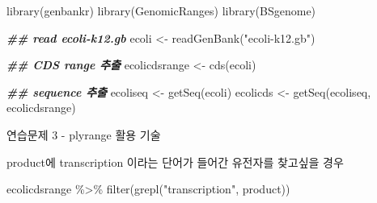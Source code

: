 \documentclass[
]{book}
\newenvironment{Shaded}{\begin{snugshade}}{\end{snugshade}}
\newcommand{\DocumentationTok}[1]{\textcolor[rgb]{0.56,0.35,0.01}{\textbf{\textit{#1}}}}
\newcommand{\FunctionTok}[1]{\textcolor[rgb]{0.00,0.00,0.00}{#1}}
\newcommand{\NormalTok}[1]{#1}
\newcommand{\OtherTok}[1]{\textcolor[rgb]{0.56,0.35,0.01}{#1}}
\newcommand{\SpecialCharTok}[1]{\textcolor[rgb]{0.00,0.00,0.00}{#1}}
\newcommand{\StringTok}[1]{\textcolor[rgb]{0.31,0.60,0.02}{#1}}
\begin{document}
\begin{Shaded}
\begin{Highlighting}[]
\FunctionTok{library}\NormalTok{(genbankr)}
\FunctionTok{library}\NormalTok{(GenomicRanges)}
\FunctionTok{library}\NormalTok{(BSgenome)}


\DocumentationTok{\#\# read ecoli{-}k12.gb}
\NormalTok{ecoli }\OtherTok{\textless{}{-}} \FunctionTok{readGenBank}\NormalTok{(}\StringTok{"ecoli{-}k12.gb"}\NormalTok{)}

\DocumentationTok{\#\# CDS range 추출}
\NormalTok{ecolicdsrange }\OtherTok{\textless{}{-}} \FunctionTok{cds}\NormalTok{(ecoli)}

\DocumentationTok{\#\# sequence 추출}
\NormalTok{ecoliseq }\OtherTok{\textless{}{-}} \FunctionTok{getSeq}\NormalTok{(ecoli)}
\NormalTok{ecolicds }\OtherTok{\textless{}{-}} \FunctionTok{getSeq}\NormalTok{(ecoliseq, ecolicdsrange)}
\end{Highlighting}
\end{Shaded}

연습문제 3 - plyrange 활용 기술

\begin{Shaded}
\end{Shaded}

product에 transcription 이라는 단어가 들어간 유전자를 찾고싶을 경우

\begin{Shaded}
\begin{Highlighting}[]
\NormalTok{ecolicdsrange }\SpecialCharTok{\%\textgreater{}\%} 
  \FunctionTok{filter}\NormalTok{(}\FunctionTok{grepl}\NormalTok{(}\StringTok{"transcription"}\NormalTok{, product))}
\end{Highlighting}
\end{Shaded}
\end{document}
